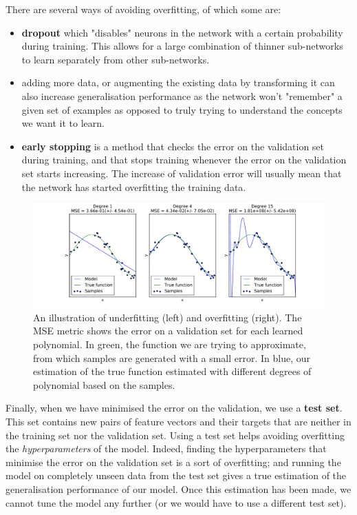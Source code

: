There are several ways of avoiding overfitting, of which some are:
\begin{itemize}
	\item \textbf{dropout} \cite{dropout} which "disables" neurons in the 
		network with a certain probability during training. This allows
		for a large combination of thinner sub-networks to learn
		separately from other sub-networks.
	\item adding more data, or augmenting the existing data by transforming
		it can also increase generalisation performance as the network
		won't "remember" a given set of examples as opposed to truly
		trying to understand the concepts we want it to learn.
	\item \textbf{early stopping} is a method that checks the error
		on the validation set during training, and that stops training
		whenever the error on the validation set starts increasing.
		The increase of validation error will usually mean that the
		network has started overfitting the training data.
\end{itemize}

\begin{figure}[H]
	\centering
	\includegraphics[width=0.8\linewidth]{fig/overfitting.pdf}
	\caption{An illustration of underfitting (left) and overfitting (right).
	The MSE metric shows the error on a validation set for each learned
	polynomial. In green, the function we are trying to approximate, from
	which samples are generated with a small error. In blue, our estimation of
	the true function estimated with different degrees of polynomial
	based on the samples.}
	\label{fig:overfitting}
\end{figure}

Finally, when we have minimised the error on the validation, we use 
a \textbf{test set}. This set contains new pairs of feature vectors and their
targets that are neither in the training set nor the validation set. Using
a test set helps avoiding overfitting the \textit{hyperparameters} of the model.
Indeed, finding the hyperparameters that minimise the error on the validation
set is a sort of overfitting; and running the model on completely unseen
data from the test set gives a true estimation of the generalisation performance
of our model. Once this estimation has been made, we cannot tune the model
any further (or we would have to use a different test set).

